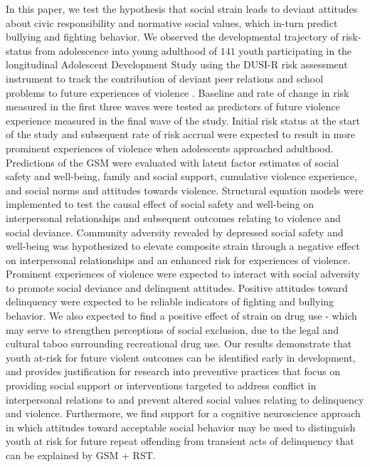 \documentclass[utf8]{article}
\begin{document}
In this paper, we test the hypothesis that social strain leads to deviant attitudes about civic responsibility and normative social values, which in-turn predict bullying and fighting behavior. We observed the developmental trajectory of risk-status from adolescence into young adulthood of $141$ youth participating in the longitudinal Adolescent Development Study \citep{Fishbein2016} using the DUSI-R risk assessment instrument to track the contribution of deviant peer relations and school problems to future experiences of violence \citep{tarter1994reliability}. Baseline and rate of change in risk measured in the first three waves were tested as predictors of future violence experience measured in the final wave of the study. Initial risk status at the start of the study and subsequent rate of risk accrual were expected to result in more prominent experiences of violence when adolescents approached adulthood. Predictions of the GSM were evaluated with latent factor estimates of social safety and well-being, family and social support, cumulative violence experience, and social norms and attitudes towards violence. Structural equation models were implemented to test the causal effect of social safety and well-being on interpersonal relationships and subsequent outcomes relating to violence and social deviance. Community adversity revealed by depressed social safety and well-being was hypothesized to elevate composite strain through a negative effect on interpersonal relationships and an enhanced risk for experiences of violence. Prominent experiences of violence were expected to interact with social adversity to promote social deviance and delinquent attitudes. Positive attitudes toward delinquency were expected to be reliable indicators of fighting and bullying behavior. We also expected to find a positive effect of strain on drug use - which may serve to strengthen perceptions of social exclusion, due to the legal and cultural taboo surrounding recreational drug use. Our results demonstrate that youth at-risk for future violent outcomes can be identified early in development, and provides justification for research into preventive practices that focus on providing social support or interventions targeted to address conflict in interpersonal relations to and prevent altered social values relating to delinquency and violence. Furthermore, we find support for a cognitive neuroscience approach in which attitudes toward acceptable social behavior may be used to distinguish youth at risk for future repeat offending from transient acts of delinquency that can be explained by GSM + RST.
\end{document}
